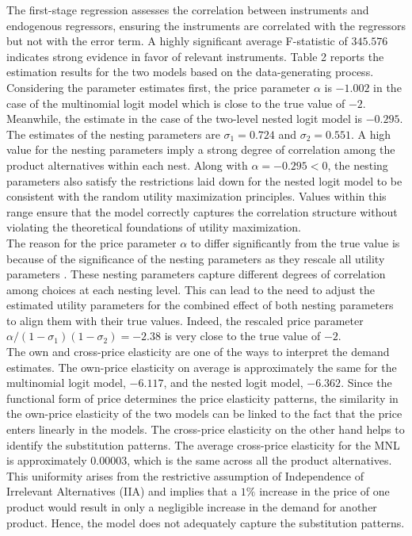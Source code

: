 \documentclass[a4paper,11pt]{article}
\begin{document}
    The first-stage regression assesses the correlation between instruments and endogenous regressors, ensuring the instruments are correlated with the regressors but not with the error term. A highly significant average F-statistic of $345.576$ indicates strong evidence in favor of relevant instruments. Table 2 reports the estimation results for the two models based on the data-generating process. Considering the parameter estimates first, the price parameter $\alpha$ is $-1.002$ in the case of the multinomial logit model which is close to the true value of $-2$. Meanwhile, the estimate in the case of the two-level nested logit model is $-0.295$. The estimates of the nesting parameters are $\sigma_{1} = 0.724$ and $\sigma_{2} = 0.551$. A high value for the nesting parameters imply a strong degree of correlation among the product alternatives within each nest. Along with $\alpha = - 0.295 < 0$, the nesting parameters also satisfy the restrictions laid down for the nested logit model to be consistent with the random utility maximization principles. Values within this range ensure that the model correctly captures the correlation structure without violating the theoretical foundations of utility maximization.\\ 
    
    The reason for the price parameter $\alpha$ to differ significantly from the true value is because of the significance of the nesting parameters as they rescale all utility parameters \cite{Grigolon&Verboven}. These nesting parameters capture different degrees of correlation among choices at each nesting level. This can lead to the need to adjust the estimated utility parameters for the combined effect of both nesting parameters to align them with their true values. Indeed, the rescaled price parameter $\alpha/(1-\sigma_{1})(1-\sigma_2) = -2.38$ is very close to the true value of $-2$.\\%

    The own and cross-price elasticity are one of the ways to interpret the demand estimates. The own-price elasticity on average is approximately the same for the multinomial logit model, $-6.117$, and the nested logit model, $-6.362$. Since the functional form of price determines the price elasticity patterns, the similarity in the own-price elasticity of the two models can be linked to the fact that the price enters linearly in the models. The cross-price elasticity on the other hand helps to identify the substitution patterns. The average cross-price elasticity for the MNL is approximately $0.00003$, which is the same across all the product alternatives. This uniformity arises from the restrictive assumption of Independence of Irrelevant Alternatives (IIA) and implies that a $1\%$ increase in the price of one product would result in only a negligible increase in the demand for another product. Hence, the model does not adequately capture the substitution patterns.\\
    
\end{document}
